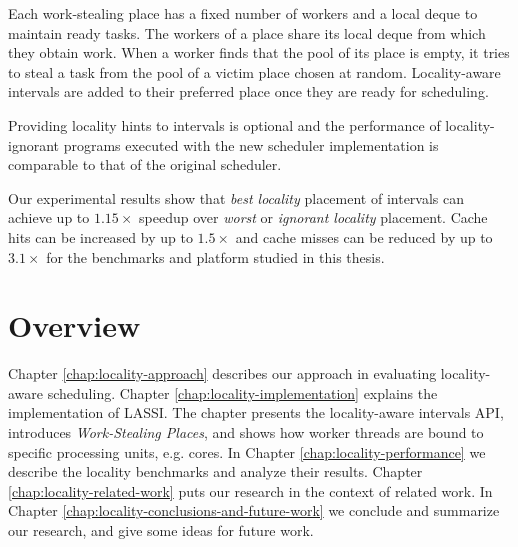 Each work-stealing place has a fixed number of workers and a local
deque to maintain ready tasks. The workers of a place share its local
deque from which they obtain work. When a worker finds that the pool
of its place is empty, it tries to steal a task from the pool of a
victim place chosen at random. Locality-aware intervals are added to
their preferred place once they are ready for scheduling.

Providing locality hints to intervals is optional and the performance
of locality-ignorant programs executed with the new scheduler
implementation is comparable to that of the original scheduler.

Our experimental results show that \emph{best locality} placement of
intervals can achieve up to $1.15\times$ speedup over \emph{worst} or
\emph{ignorant locality} placement. Cache hits can be increased by up
to $1.5\times$ and cache misses can be reduced by up to $3.1\times$
for the benchmarks and platform studied in this thesis.


\section{Overview}
\label{sec:locality-introduction-locality-overview}

Chapter \ref{chap:locality-approach} describes our approach in
evaluating locality-aware scheduling. Chapter
\ref{chap:locality-implementation} explains the implementation of
LASSI. The chapter presents the locality-aware intervals API,
introduces \emph{Work-Stealing Places}, and shows how worker threads
are bound to specific processing units, e.g. cores.  In Chapter
\ref{chap:locality-performance} we describe the locality benchmarks
and analyze their results. Chapter \ref{chap:locality-related-work}
puts our research in the context of related work. In Chapter
\ref{chap:locality-conclusions-and-future-work} we conclude and
summarize our research, and give some ideas for future work.



